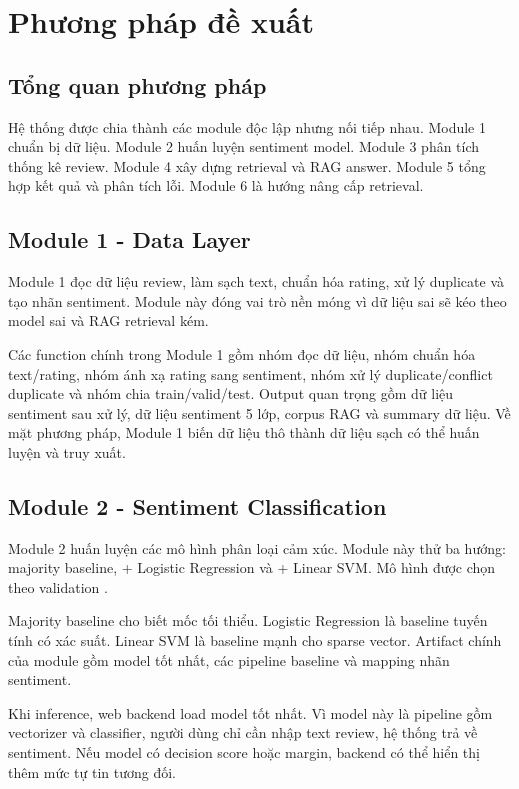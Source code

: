 \chapter{Phương pháp đề xuất}
\section{Tổng quan phương pháp}
Hệ thống được chia thành các module độc lập nhưng nối tiếp nhau. Module 1 chuẩn bị dữ liệu. Module 2 huấn luyện sentiment model. Module 3 phân tích thống kê review. Module 4 xây dựng retrieval và RAG answer. Module 5 tổng hợp kết quả và phân tích lỗi. Module 6 là hướng nâng cấp retrieval.

\section{Module 1 - Data Layer}
Module 1 đọc dữ liệu review, làm sạch text, chuẩn hóa rating, xử lý duplicate và tạo nhãn sentiment. Module này đóng vai trò nền móng vì dữ liệu sai sẽ kéo theo model sai và RAG retrieval kém.

Các function chính trong Module 1 gồm nhóm đọc dữ liệu, nhóm chuẩn hóa text/rating, nhóm ánh xạ rating sang sentiment, nhóm xử lý duplicate/conflict duplicate và nhóm chia train/valid/test. Output quan trọng gồm dữ liệu sentiment sau xử lý, dữ liệu sentiment 5 lớp, corpus RAG và summary dữ liệu. Về mặt phương pháp, Module 1 biến dữ liệu thô thành dữ liệu sạch có thể huấn luyện và truy xuất.

\section{Module 2 - Sentiment Classification}
Module 2 huấn luyện các mô hình phân loại cảm xúc. Module này thử ba hướng: majority baseline, \TFIDF{} + Logistic Regression và \TFIDF{} + Linear SVM. Mô hình được chọn theo validation \MacroFOne{}.

Majority baseline cho biết mốc tối thiểu. Logistic Regression là baseline tuyến tính có xác suất. Linear SVM là baseline mạnh cho \TFIDF{} sparse vector. Artifact chính của module gồm model tốt nhất, các pipeline baseline và mapping nhãn sentiment.

Khi inference, web backend load model tốt nhất. Vì model này là pipeline gồm \TFIDF{} vectorizer và classifier, người dùng chỉ cần nhập text review, hệ thống trả về sentiment. Nếu model có decision score hoặc margin, backend có thể hiển thị thêm mức tự tin tương đối.
